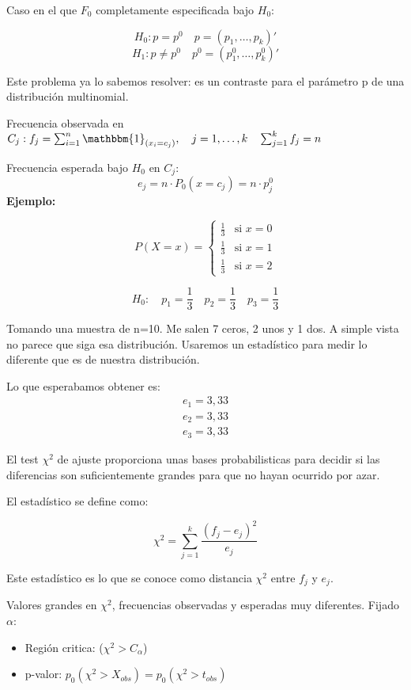 Caso en el que $F_0$ completamente especificada bajo $H_0$:

\[
H_0: p=p^0 \quad p=(p_1,\dots,p_k)'
\]
\[
H_1: p \neq p^0 \quad p^0=(p_1^0,\dots,p_k^0)'
\]

Este problema ya lo sabemos resolver: es un contraste para el parámetro p de una distribución multinomial.

Frecuencia observada en $C_j: f_j=\sum_{i=1}^{n} \mathbbm{1}_{(x_i=c_j)}, \quad j=1,\dots,k \quad \sum_{j=1}^{k} f_j=n$

Frecuencia esperada bajo $H_0$ en $C_j$:
\[
e_j=n \cdot P_0(x=c_j)=n \cdot p_j^0
\]
\newpage
\textbf{Ejemplo:}

\[
P(X = x) = 
\left\{
    \begin{matrix}
        \frac{1}{3} & \text{si } x = 0 \\[0.5em]
        \frac{1}{3} & \text{si } x = 1 \\[0.5em]
        \frac{1}{3} & \text{si } x = 2
    \end{matrix}
\right.
\]


\[
H_0:\quad p_1=\frac{1}{3} \quad p_2=\frac{1}{3} \quad p_3=\frac{1}{3}
\]

Tomando una muestra de n=10. Me salen 7 ceros, 2 unos y 1 dos.
A simple vista no parece que siga esa distribución. Usaremos un estadístico para medir lo diferente que es de nuestra distribución.

Lo que esperabamos obtener es:
\[
\begin{matrix}
    e_1=3,33\\
    e_2=3,33\\
    e_3=3,33
\end{matrix}
\]

El test $\chi^2$ de ajuste proporciona unas bases probabilisticas para decidir si las diferencias son suficientemente grandes para que no hayan ocurrido por azar.

El estadístico se define como:

\[
\chi^2=\sum_{j=1}^{k} \frac{(f_j-e_j)^2}{e_j}
\]

Este estadístico es lo que se conoce como distancia $\chi^2$ entre $f_j$ y $e_j$.

Valores grandes en $\chi^2$, frecuencias observadas y esperadas muy diferentes. 
Fijado $\alpha$:
 \begin{itemize}
    \item  Región critica: ($\chi^2 > C_\alpha$)
    \item  p-valor: $p_0(\chi^2>X_{obs})=p_0(\chi^2>t_{obs})$
 \end{itemize}

